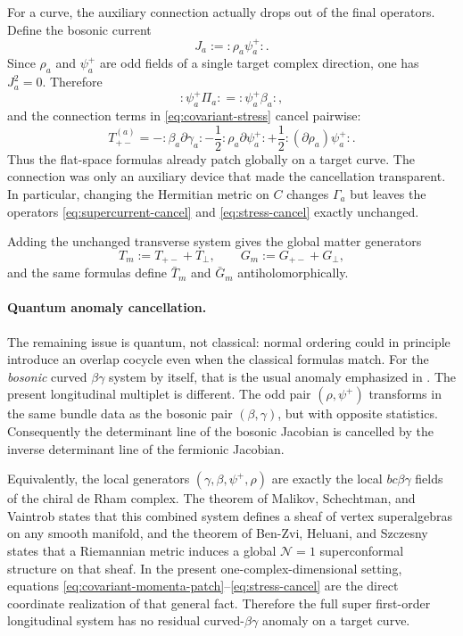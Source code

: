 \documentclass[11pt]{article}
\newcommand{\mc}[1]{\mathcal{#1}}
\begin{document}
For a curve, the auxiliary connection actually drops out of the final operators. Define the bosonic current
\begin{equation}\label{eq:nilpotent-current}
J_a:=:\!\rho_a\psi_a^+\!:.
\end{equation}
Since $\rho_a$ and $\psi_a^+$ are odd fields of a single target complex direction, one has $J_a^2=0$. Therefore
\begin{equation}\label{eq:supercurrent-cancel}
:\!\psi_a^+\Pi_a\!:
=
:\!\psi_a^+\beta_a\!:,
\end{equation}
and the connection terms in \eqref{eq:covariant-stress} cancel pairwise:
\begin{equation}\label{eq:stress-cancel}
T_{+-}^{(a)}
=
-:\!\beta_a\partial\gamma_a\!:
-\frac12:\!\rho_a\partial\psi_a^+\!:
+\frac12:\!(\partial\rho_a)\psi_a^+\!:.
\end{equation}
Thus the flat-space formulas already patch globally on a target curve. The connection was only an auxiliary device that made the cancellation transparent. In particular, changing the Hermitian metric on $C$ changes $\Gamma_a$ but leaves the operators \eqref{eq:supercurrent-cancel} and \eqref{eq:stress-cancel} exactly unchanged.

Adding the unchanged transverse system gives the global matter generators
\begin{equation}\label{eq:global-matter-operators}
T_m:=T_{+-}+T_\perp,
\qquad
G_m:=G_{+-}+G_\perp,
\end{equation}
and the same formulas define $\bar T_m$ and $\bar G_m$ antiholomorphically.

\paragraph{Quantum anomaly cancellation.}
The remaining issue is quantum, not classical: normal ordering could in principle introduce an overlap cocycle even when the classical formulas match. For the \emph{bosonic} curved $\beta\gamma$ system by itself, that is the usual anomaly emphasized in \cite{nekrasov2005curvedbetagammasystems}. The present longitudinal multiplet is different. The odd pair $(\rho,\psi^+)$ transforms in the same bundle data as the bosonic pair $(\beta,\gamma)$, but with opposite statistics. Consequently the determinant line of the bosonic Jacobian is cancelled by the inverse determinant line of the fermionic Jacobian.

Equivalently, the local generators $(\gamma,\beta,\psi^+,\rho)$ are exactly the local $bc\beta\gamma$ fields of the chiral de Rham complex. The theorem of Malikov, Schechtman, and Vaintrob \cite{msv1999chiralderham} states that this combined system defines a sheaf of vertex superalgebras on any smooth manifold, and the theorem of Ben-Zvi, Heluani, and Szczesny \cite{benzvi2008supersymmetrycdr} states that a Riemannian metric induces a global $\mc N=1$ superconformal structure on that sheaf. In the present one-complex-dimensional setting, equations \eqref{eq:covariant-momenta-patch}--\eqref{eq:stress-cancel} are the direct coordinate realization of that general fact. Therefore the full super first-order longitudinal system has no residual curved-$\beta\gamma$ anomaly on a target curve.
\end{document}
